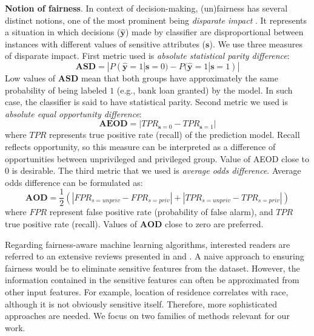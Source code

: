 \documentclass[preprint,12pt]{elsarticle}
\begin{document}
\textbf{Notion of fairness}. In context of decision-making, (un)fairness has several distinct notions, one of the most prominent being {\em disparate impact} \cite{barocas2016big}. It represents a situation in which decisions ($\hat{\mathbf{y}}$) made by classifier are disproportional between instances with different values of sensitive attributes ($\mathbf{s}$). We use three measures of disparate impact. First metric used is \textit{absolute statistical parity difference}:
\begin{equation}
\mathbf{ASD} = |P(\hat{\mathbf{y}}=1|\mathbf{s}=0) - P(\hat{\mathbf{y}}=1|\mathbf{s}=1)|
\label{metric:asd}
\end{equation}
Low values of $\mathbf{ASD}$ mean that both groups have approximately the same probability of being labeled $1$ (e.g., bank loan granted) by the model. In such case, the classifier is said to have statistical parity.
Second metric we used is \textit{absolute equal opportunity difference}:
\begin{equation}
\mathbf{AEOD} = |TPR_{\mathbf{s}=0} - TPR_{\mathbf{s}=1}|
\label{metric:aeod}
\end{equation}
where $TPR$ represents true positive rate (recall) of the prediction model. Recall reflects opportunity, so this measure can be interpreted as a difference of opportunities between unprivileged and privileged group. Value of AEOD close to 0 is desirable. The third metric that we used is \textit{average odds difference}. Average odds difference can be formulated as:
\begin{equation}
\mathbf{AOD} = \frac{1}{2}(|FPR_{s=unpriv} - FPR_{s=priv}| + |TPR_{s=unpriv} - TPR_{s=priv}|)
\label{metric:aod}
\end{equation}
where $FPR$ represent false positive rate (probability of false alarm), and $TPR$ true positive rate (recall). Values of $\mathbf{AOD}$ close to zero are preferred.

Regarding fairness-aware machine learning algorithms, interested readers are referred to an extensive reviews presented in \cite{friedler2019comparative} and \cite{corbett2018measure}. A naive approach to ensuring fairness would be to eliminate sensitive features from the dataset. However, the information contained in the sensitive features can often be approximated from other input features. For example, location of residence correlates with race, although it is not obviously sensitive itself. Therefore, more sophisticated approaches are needed. We focus on two families of methods relevant for our work.
\end{document}
